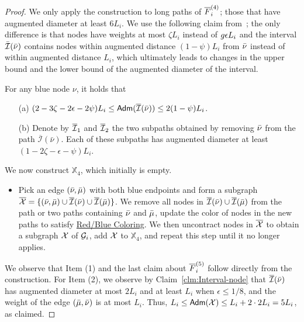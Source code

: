 \begin{proof} We only apply the construction to long paths of $\overline{F}^{(4)}_i$; those that have  augmented diameter at least $6L_i$. We use the following claim from~\cite{LS21}; the only difference is that nodes have weights at most $\zeta L_i$ instead of $g\epsilon L_i$ and the interval $\bar{\mathcal{I}}(\bar\nu)$ contains nodes within augmented distance $(1-\psi)L_i$ from $\bar\nu$ instead of within augmented distance $L_i$, which ultimately leads to changes in the upper bound and the lower bound of the augmented diameter of the interval.
	
	\begin{claim}\label{clm:Interval-node}
		For any blue node $\nu$, it holds that
		\begin{itemize}[noitemsep]
			\item[(a)] $ (2 - 3\zeta - 2 \epsilon-2\psi)L_i \leq  \mathsf{Adm}(\overline{\mathcal{I}}(\bar{\nu}))\leq 2(1-\psi)L_i $.
			\item[(b)]   	Denote by  $\overline{\mathcal{I}}_1$ and $\overline{\mathcal{I}}_2$  the two subpaths obtained by removing $\bar\nu$ from the path $\overline{\mathcal{I}}(\bar{\nu})$. 
			Each of these subpaths has augmented diameter at least $(1-2\zeta - \epsilon -\psi)L_i$.
		\end{itemize}
	\end{claim}
	
	We now construct $\mathbb{X}_4$, which initially is empty. 
	
	\begin{itemize}
		\item  Pick an edge $(\bar\nu,\bar\mu)$ with both blue endpoints and  form a subgraph $\overline{\mathcal{X}} = \{(\bar\nu,\bar\mu)\cup \overline{\mathcal{I}}(\bar\nu) \cup \overline{\mathcal{I}}(\bar\mu)\}$. We remove  all nodes in  $\overline{\mathcal{I}}(\bar\nu) \cup \overline{\mathcal{I}}(\bar\mu) $ from the path or two paths containing $\bar\nu$ and $\bar\mu$, update the color of nodes in the new paths to satisfy \hyperlink{RBColoring}{Red/Blue Coloring}. We then uncontract nodes in $\overline{\mathcal{X}}$ to obtain a subgraph $\mathcal{X}$ of $\mathcal{G}_i$, add $\mathcal{X}$ to $\mathbb{X}_4$, and  repeat this step until it no longer applies.
	\end{itemize}
	
	We observe that Item (1) and  the last claim about  $\overline{F}^{(5)}_i$ follow directly from the construction. For Item (2), we observe by Claim~\ref{clm:Interval-node}  that $\overline{\mathcal{I}}(\bar\nu)$ has augmented diameter at most $2L_i$ and at least $L_i$ when $\epsilon  \leq 1/8$, and  the weight of the edge $(\bar\mu,\bar\nu)$ is at most $L_i$. Thus, $L_i \leq \mathsf{Adm}(\mathcal{X})\leq L_i + 2\cdot 2L_i = 5L_i$, as claimed.
	

\end{proof}

